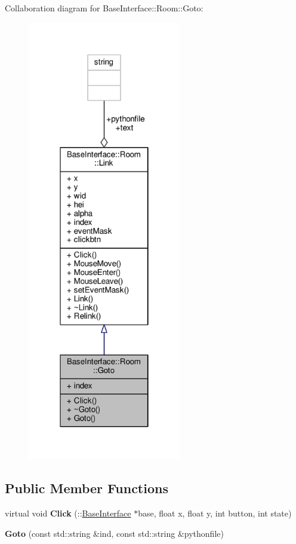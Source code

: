 Collaboration diagram for Base\+Interface\+:\+:Room\+:\+:Goto\+:
\nopagebreak
\begin{figure}[H]
\begin{center}
\leavevmode
\includegraphics[width=190pt]{d0/df6/classBaseInterface_1_1Room_1_1Goto__coll__graph}
\end{center}
\end{figure}
\subsection*{Public Member Functions}
\begin{DoxyCompactItemize}
\item 
virtual void {\bfseries Click} (\+::\hyperlink{classBaseInterface}{Base\+Interface} $\ast$base, float x, float y, int button, int state)\hypertarget{classBaseInterface_1_1Room_1_1Goto_a8c620b5a2f129ed0cc891194424f4361}{}\label{classBaseInterface_1_1Room_1_1Goto_a8c620b5a2f129ed0cc891194424f4361}

\item 
{\bfseries Goto} (const std\+::string \&ind, const std\+::string \&pythonfile)\hypertarget{classBaseInterface_1_1Room_1_1Goto_a53aa0adb6bcef0ed59394f90b6ac30aa}{}\label{classBaseInterface_1_1Room_1_1Goto_a53aa0adb6bcef0ed59394f90b6ac30aa}

\end{DoxyCompactItemize}
